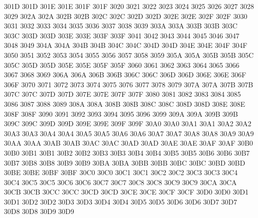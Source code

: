 \OP 301D 301D
\CL 301E 301E
\CL 301F 301F
 3020
 3021
 3022
 3023
 3024
 3025
 3026
 3027
 3028
 3029
\CM 302A 302A
\CM 302B 302B
\CM 302C 302C
\CM 302D 302D
\CM 302E 302E
\CM 302F 302F
 3030
 3031
 3032
 3033
 3034
 3035
 3036
 3037
 3038
 3039
\ID 303A 303A
\NS 303B 303B
\NS 303C 303C
\ID 303D 303D
\ID 303E 303E
\ID 303F 303F
 3041
 3042
 3043
 3044
 3045
 3046
 3047
 3048
 3049
\ID 304A 304A
\ID 304B 304B
\ID 304C 304C
\ID 304D 304D
\ID 304E 304E
\ID 304F 304F
 3050
 3051
 3052
 3053
 3054
 3055
 3056
 3057
 3058
 3059
\ID 305A 305A
\ID 305B 305B
\ID 305C 305C
\ID 305D 305D
\ID 305E 305E
\ID 305F 305F
 3060
 3061
 3062
 3063
 3064
 3065
 3066
 3067
 3068
 3069
\ID 306A 306A
\ID 306B 306B
\ID 306C 306C
\ID 306D 306D
\ID 306E 306E
\ID 306F 306F
 3070
 3071
 3072
 3073
 3074
 3075
 3076
 3077
 3078
 3079
\ID 307A 307A
\ID 307B 307B
\ID 307C 307C
\ID 307D 307D
\ID 307E 307E
\ID 307F 307F
 3080
 3081
 3082
 3083
 3084
 3085
 3086
 3087
 3088
 3089
\ID 308A 308A
\ID 308B 308B
\ID 308C 308C
\ID 308D 308D
\NS 308E 308E
\ID 308F 308F
 3090
 3091
 3092
 3093
 3094
 3095
 3096
 3099
\CM 309A 309A
\NS 309B 309B
\NS 309C 309C
\NS 309D 309D
\NS 309E 309E
\ID 309F 309F
\NS 30A0 30A0
\NS 30A1 30A1
\ID 30A2 30A2
\NS 30A3 30A3
\ID 30A4 30A4
\NS 30A5 30A5
\ID 30A6 30A6
\NS 30A7 30A7
\ID 30A8 30A8
\NS 30A9 30A9
\ID 30AA 30AA
\ID 30AB 30AB
\ID 30AC 30AC
\ID 30AD 30AD
\ID 30AE 30AE
\ID 30AF 30AF
\ID 30B0 30B0
\ID 30B1 30B1
\ID 30B2 30B2
\ID 30B3 30B3
\ID 30B4 30B4
\ID 30B5 30B5
\ID 30B6 30B6
\ID 30B7 30B7
\ID 30B8 30B8
\ID 30B9 30B9
\ID 30BA 30BA
\ID 30BB 30BB
\ID 30BC 30BC
\ID 30BD 30BD
\ID 30BE 30BE
\ID 30BF 30BF
\ID 30C0 30C0
\ID 30C1 30C1
\ID 30C2 30C2
\NS 30C3 30C3
\ID 30C4 30C4
\ID 30C5 30C5
\ID 30C6 30C6
\ID 30C7 30C7
\ID 30C8 30C8
\ID 30C9 30C9
\ID 30CA 30CA
\ID 30CB 30CB
\ID 30CC 30CC
\ID 30CD 30CD
\ID 30CE 30CE
\ID 30CF 30CF
\ID 30D0 30D0
\ID 30D1 30D1
\ID 30D2 30D2
\ID 30D3 30D3
\ID 30D4 30D4
\ID 30D5 30D5
\ID 30D6 30D6
\ID 30D7 30D7
\ID 30D8 30D8
\ID 30D9 30D9
